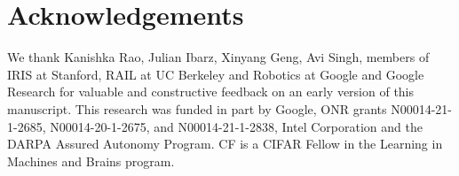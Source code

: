 \documentclass[../thesis.tex]{subfiles}
\begin{document}
    
\section*{Acknowledgements}
We thank Kanishka Rao, Julian Ibarz, Xinyang Geng, Avi Singh, members of IRIS at Stanford, RAIL at UC Berkeley and Robotics at Google and Google Research for valuable and constructive feedback on an early version of this manuscript. This research was funded in part by Google, ONR grants N00014-21-1-2685, N00014-20-1-2675, and N00014-21-1-2838, Intel Corporation and the DARPA Assured Autonomy Program. CF is a CIFAR Fellow in the Learning in Machines and Brains program. 
\end{document}
